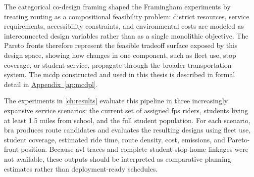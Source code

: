 The categorical co-design framing shaped the Framingham experiments by treating routing as a compositional feasibility problem: district resources, service requirements, accessibility constraints, and environmental costs are modeled as interconnected design variables rather than as a single monolithic objective. The Pareto fronts therefore represent the feasible tradeoff surface exposed by this design space, showing how changes in one component, such as fleet use, stop coverage, or student service, propagate through the broader transportation system. The \gls{mcdp} constructed and used in this thesis is described in formal detail in \hyperref[ap:mcdpl]{Appendix~\ref*{ap:mcdpl}}.

The experiments in \autoref{ch:results} evaluate this pipeline in three increasingly expansive service scenarios: the current set of assigned \gls{fps} riders, students living at least 1.5 miles from school, and the full student population. For each scenario, \gls{bra} produces route candidates and evaluates the resulting designs using fleet use, student coverage, estimated ride time, route density, cost, emissions, and Pareto-front position. Because \gls{avl} traces and complete student-stop-home linkages were not available, these outputs should be interpreted as comparative planning estimates rather than deployment-ready schedules.

